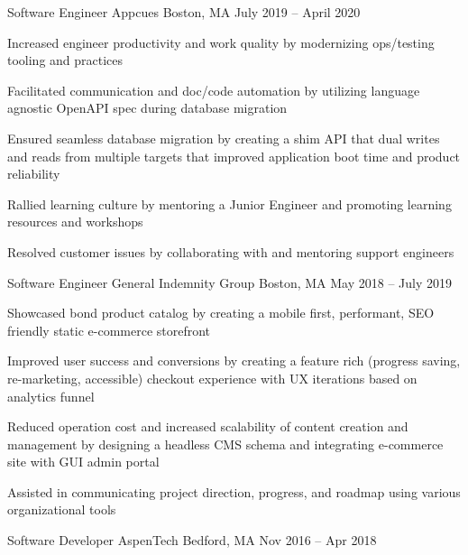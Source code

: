\documentclass[]{awesome-cv}
\begin{document}
\begin{cventries}
	\cventry
	{Software Engineer}
	{Appcues}
	{Boston, MA}
	{July 2019 – April 2020}
	{\begin{cvitems}
		\item {Increased engineer productivity and work quality by modernizing ops/testing tooling and practices}
		\item {Facilitated communication and doc/code automation by utilizing language agnostic OpenAPI spec during database migration}
		\item {Ensured seamless database migration by creating a shim API that dual writes and reads from multiple targets that improved application boot time and product reliability}
		\item {Rallied learning culture by mentoring a Junior Engineer and promoting learning resources and workshops}
		\item {Resolved customer issues by collaborating with and mentoring support engineers}
		\end{cvitems}}
	\cventry
	{Software Engineer}
	{General Indemnity Group}
	{Boston, MA}
	{May 2018 – July 2019}
	{\begin{cvitems}
		\item {Showcased bond product catalog by creating a mobile first, performant, SEO friendly static e-commerce storefront}
		\item {Improved user success and conversions by creating a feature rich (progress saving, re-marketing, accessible) checkout experience with UX iterations based on analytics funnel}
		\item {Reduced operation cost and increased scalability of content creation and management by designing a headless CMS schema and integrating e-commerce site with GUI admin portal}
		\item {Assisted in communicating project direction, progress, and roadmap using various organizational tools}
		\end{cvitems}}
	\cventry
	{Software Developer}
	{AspenTech}
	{Bedford, MA}
	{Nov 2016 – Apr 2018}
	{\begin{cvitems}
		\end{cvitems}}
	\vspace{-5mm}
\end{cventries}
\end{document}
